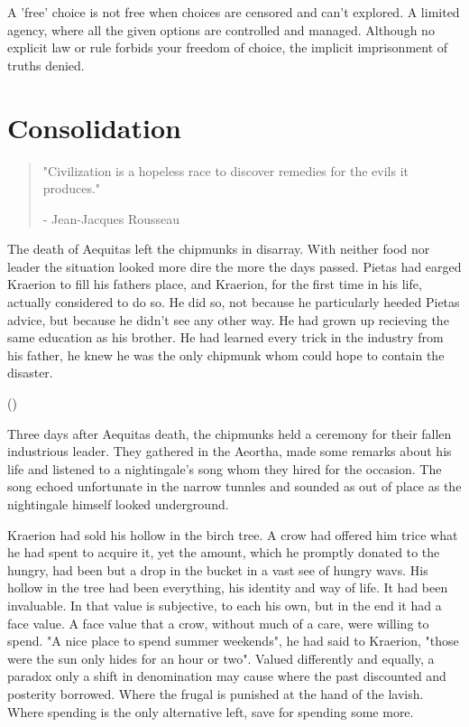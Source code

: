 \documentclass[smalldemyvopaper,11pt,twoside,onecolumn,openright,extrafontsizes]{memoir}
\newlength\drop
\begin{document}
A 'free' choice is not free when choices are censored and can't explored. A limited agency, where all the given options are controlled and managed. Although no explicit law or rule forbids your freedom of choice, the implicit imprisonment of truths denied. 

\chapter{Consolidation}

\vspace{-1.3cm}
\begin{localsize}{10}
	\begin{quote}
		"Civilization is a hopeless race to discover remedies for the evils it produces."
		\begin{flushright}- Jean-Jacques Rousseau\end{flushright}
	\end{quote} 
\end{localsize}
\vspace{1cm}

The death of Aequitas left the chipmunks in disarray. With neither food nor leader the situation looked more dire the more the days passed. Pietas had earged Kraerion to fill his fathers place, and Kraerion, for the first time in his life, actually considered to do so. He did so, not because he particularly heeded Pietas advice, but because he didn't see any other way. He had grown up recieving the same education as his brother. He had learned every trick in the industry from his father, he knew he was the only chipmunk whom could hope to contain the disaster.

()



Three days after Aequitas death, the chipmunks held a ceremony for their fallen industrious leader. They gathered in the Aeortha, made some remarks about his life and listened to a nightingale's song whom they hired for the occasion. The song echoed unfortunate in the narrow tunnles and sounded as out of place as the nightingale himself looked underground. 

 
Kraerion had sold his hollow in the birch tree. A crow had offered him trice what he had spent to acquire it, yet the amount, which he promptly donated to the hungry, had been but a drop in the bucket in a vast see of hungry wavs. 
His hollow in the tree had been everything, his identity and way of life. It had been invaluable. In that value is subjective, to each his own, but in the end it had a face value. A face value that a crow, without much of a care, were willing to spend. "A nice place to spend summer weekends", he had said to Kraerion, "those were the sun only hides for an hour or two". Valued differently and equally, a paradox only a shift in denomination may cause where the past discounted and posterity borrowed. Where the frugal is punished at the hand of the lavish. Where spending is the only alternative left, save for spending some more.
\end{document}
